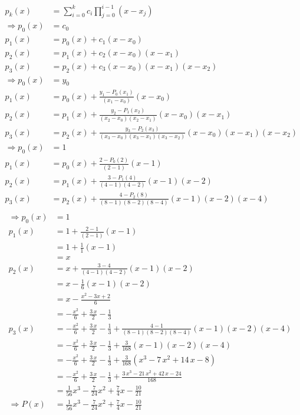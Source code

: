 {\begin{enumerate}
\[
\begin{aligned}
p_k(x) &= \sum_{i=0}^k c_i \prod_{j=0}^{i-1} (x - x_j) \\
\Rightarrow p_0(x) &= c_0 \\
p_1(x) &= p_0(x) + c_1(x -x_0) \\
p_2(x) &= p_1(x) + c_2(x -x_0)(x - x_1) \\
p_3(x) &= p_2(x) + c_3(x -x_0)(x - x_1)(x - x_2) \\
\Rightarrow p_0(x) &= y_0 \\
p_1(x) &= p_0(x) + \frac{y_1 - P_0(x_1)}{(x_1 - x_0)} (x -x_0) \\
p_2(x) &= p_1(x) + \frac{y_2 - P_1(x_2)}{(x_2 - x_0)(x_2 - x_1)} (x -x_0)(x - x_1) \\
p_3(x) &= p_2(x) + \frac{y_3 - P_2(x_3)}{(x_3 - x_0)(x_3 - x_1)(x_3 - x_2)} (x -x_0)(x - x_1)(x - x_2) \\
\Rightarrow p_0(x) &= 1 \\
p_1(x) &= p_0(x) + \frac{2 - P_0(2)}{(2 - 1)} (x -1) \\
p_2(x) &= p_1(x) + \frac{3 - P_1(4)}{(4 - 1)(4 - 2)} (x -1)(x - 2) \\
p_3(x) &= p_2(x) + \frac{4 - P_2(8)}{(8 - 1)(8 - 2)(8 - 4)} (x -1)(x - 2)(x - 4) \\
\end{aligned}
\]
\[
\begin{aligned}
\Rightarrow p_0(x) &= 1 \\
p_1(x) &= 1 + \frac{2 - 1}{(2 - 1)} (x -1) \\
&= 1 + \frac{1}{1} (x - 1) \\
&= x \\
p_2(x) &= x + \frac{3 - 4}{(4 - 1)(4 - 2)} (x -1)(x - 2) \\
&= x - \frac{1}{6} (x - 1) (x - 2) \\
&= x - \frac{x^2 - 3x + 2}{6} \\
&= - \frac{x^2}{6} + \frac{3\, x}{2} - \frac{1}{3} \\
p_3(x) &= - \frac{x^2}{6} + \frac{3\, x}{2} - \frac{1}{3} + \frac{4 - 1}{(8 - 1)(8 - 2)(8 - 4)} (x -1)(x - 2)(x - 4) \\
&= - \frac{x^2}{6} + \frac{3\, x}{2} - \frac{1}{3} + \frac{3}{168} (x -1)(x-2)(x-4) \\
&= - \frac{x^2}{6} + \frac{3\, x}{2} - \frac{1}{3} + \frac{3}{168} \left(x^3 - 7\, x^2 + 14\, x - 8\right) \\
&= - \frac{x^2}{6} + \frac{3\, x}{2} - \frac{1}{3} + \frac{3\, x^3 - 21\, x^2 + 42\, x - 24}{168} \\
&= \frac{1}{56} x^3 - \frac{7}{24} x^2 + \frac{7}{4} x - \frac{10}{21} \\
\Rightarrow P(x) &= \frac{1}{56} x^3 - \frac{7}{24} x^2 + \frac{7}{4} x - \frac{10}{21}
\end{aligned}
\]

\end{enumerate}

}
